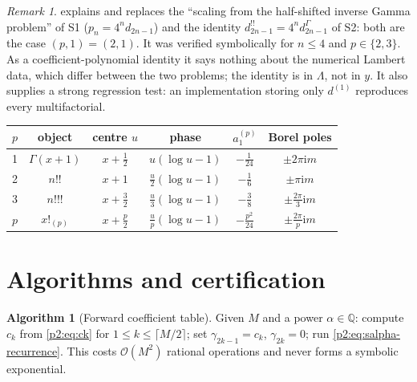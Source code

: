 \documentclass[11pt,a4paper,oneside]{book}
\theoremstyle{plain}
\theoremstyle{definition}
\newtheorem{algorithm}[theorem]{Algorithm}
\theoremstyle{remark}
\newtheorem{remark}[theorem]{Remark}
\newcommand{\Rat}{\mathbb{Q}}
\newcommand{\ii}{\mathrm{i}}
\newcommand{\bigO}{\mathcal{O}}
\begin{document}
\begin{remark}
 explains and replaces the ``scaling from the
half-shifted inverse Gamma problem'' of \textsf{S1} (\(p_n=4^nd_{2n-1}\)) and
the identity \(d^{!!}_{2n-1}=4^nd^{\Gamma}_{2n-1}\) of \textsf{S2}: both are
the case \((p,1)=(2,1)\).  It was verified symbolically for \(n\le4\) and
\(p\in\{2,3\}\).  As a coefficient-polynomial identity it says nothing about
the numerical Lambert data, which differ between the two problems; the
identity is in \(\Lambda\), not in \(y\).  It also supplies a strong regression
test: an implementation storing only \(d^{(1)}\) reproduces every
multifactorial.
\end{remark}

\begin{center}
\small
\begin{tabular}{cccccc}
\toprule
\(p\) & object & centre \(u\) & phase & \(a^{(p)}_1\) & Borel poles\\
\midrule
1 & \(\Gamma(x+1)\) & \(x+\tfrac12\) & \(u(\log u-1)\) & \(-\tfrac1{24}\)
  & \(\pm2\pi\ii m\)\\
2 & \(n!!\) & \(x+1\) & \(\tfrac u2(\log u-1)\) & \(-\tfrac16\)
  & \(\pm\pi\ii m\)\\
3 & \(n!!!\) & \(x+\tfrac32\) & \(\tfrac u3(\log u-1)\) & \(-\tfrac38\)
  & \(\pm\tfrac{2\pi}3\ii m\)\\
\(p\) & \(x!_{(p)}\) & \(x+\tfrac p2\) & \(\tfrac up(\log u-1)\)
  & \(-\tfrac{p^2}{24}\) & \(\pm\tfrac{2\pi}p\ii m\)\\
\bottomrule
\end{tabular}
\end{center}

\section{Algorithms and certification}
\label{p2:sec:algorithms}

\begin{algorithm}[Forward coefficient table]
\label{p2:alg:forward}
Given \(M\) and a power \(\alpha\in\Rat\): compute \(c_k\) from
\cref{p2:eq:ck} for \(1\le k\le\lceil M/2\rceil\); set \(\gamma_{2k-1}=c_k\),
\(\gamma_{2k}=0\); run \cref{p2:eq:salpha-recurrence}.  This costs
\(\bigO(M^2)\) rational operations and never forms a symbolic exponential.
\end{algorithm}
\end{document}
